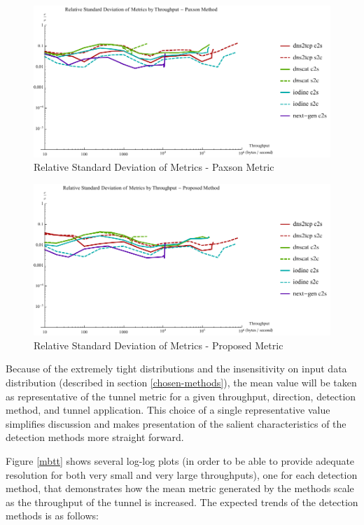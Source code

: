 \documentclass[12pt]{report}
\theoremstyle{remark}
\theoremstyle{definition}
\theoremstyle{definition}
\theoremstyle{definition}
\begin{document}
\begin{figure}
\centering
\includegraphics[width=\textwidth]{../figures/rsd-paxson.pdf}
\caption[Relative Standard Deviation of Metrics - Paxson Metric]{Relative Standard Deviation of Metrics - Paxson Metric}
\label{rsd-paxson}
\end{figure}

\begin{figure}
\centering
\includegraphics[width=\textwidth]{../figures/rsd-proposed.pdf}
\caption[Relative Standard Deviation of Metrics - Proposed Metric]{Relative Standard Deviation of Metrics - Proposed Metric}
\label{rsd-proposed}
\end{figure}

Because of the extremely tight distributions and the insensitivity on input data
distribution (described in section \ref{chosen-methods}), the mean value will be
taken as representative of the tunnel metric for a given throughput, direction,
detection method, and tunnel application. This choice of a single representative
value simplifies discussion and makes presentation of the salient
characteristics of the detection methods more straight forward.

Figure \ref{mbtt} shows several log-log plots (in order to be able to provide
adequate resolution for both very small and very large throughputs), one for
each detection method, that demonstrates how the mean metric generated by the
methods scale as the throughput of the tunnel is increased. The expected trends
of the detection methods is as follows:
\end{document}
